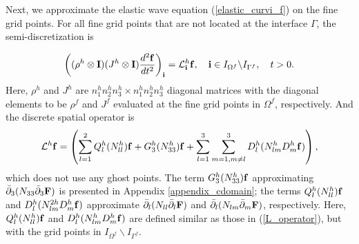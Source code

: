 {Next, we approximate the elastic wave equation (\ref{elastic_curvi_f}) on the fine grid points. For all fine grid points that are not located at the interface $\Gamma$, the semi-discretization  is
{%
\begin{equation}\label{elastic_semi_f}
\left(({\rho}^{h}\otimes{\bf I})(J^h\otimes{\bf I})\frac{d^2{{\bf f}}}{dt^2}\right)_{\bf i} = {\mathcal{L}}^{h}_{\bf i} {{\bf f}},\quad {\bf i}\in I_{\Omega^f}\backslash I_{{\Gamma^f}},\quad t>0.
\end{equation}
Here, $\rho^{h}$ and $J^{h}$ are $n_1^{h}n_2^{h}n_3^{h}\times n_1^{h}n_2^{h}n_3^{h}$ diagonal matrices with the diagonal elements to be $\rho^f$ and $J^f$ evaluated at the fine grid points in $\Omega^f$, respectively. And the discrete spatial operator is
\begin{equation}\label{Lf_operator}
{\mathcal{L}}^{h} {{\bf f}} = \left(\sum_{l=1}^2{Q}_l^{h}({N}_{ll}^h){\bf f}+{G}_3^{h}({N}_{33}^h){\bf f}+\sum_{l=1}^3\sum_{m=1,m\neq l}^3{D}_l^{h}({N}_{lm}^{h}{D}_m^{h}{\bf f})\right),
\end{equation}
which does not use any ghost points. The term ${G}_3^{h}(N_{33}^{h}){\bf f}$ approximating $\bar{\partial}_3(N_{33}\bar{\partial}_3 {\bf F})$ is presented in Appendix \ref{appendix_cdomain}; the terms $Q_l^{h}(N_{ll}^{h}){\bf f}$ and $D_{l}^{h}(N_{lm}^{2h}D_m^{h}{\bf f})$ approximate $\bar{\partial}_l(N_{ll}\bar{\partial}_l{\bf F})$ and $\bar{\partial}_l(N_{lm}\bar{\partial}_m {\bf F})$, respectively. Here, ${Q}_l^{h}({N}_{ll}^h){\bf f}$ and ${D}_l^{h}({N}_{lm}^{h}{D}_m^{h}{\bf f})$ are defined similar as those in (\ref{L_operator}), but with the grid points in $I_{\Omega^f}\backslash I_{{\Gamma^f}}$.

}}
